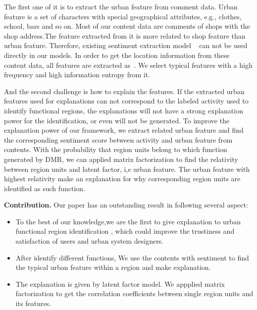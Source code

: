 \documentclass[runningheads]{llncs}
\begin{document}
The first one of it is to extract the urban feature from comment data.
Urban feature is a set of characters with special geographical attributes, e.g., clothes, school, bars and so on.
Most of our content data are comments of shops with the shop address.The feature extracted from it is more related to shop feature than urban feature.
Therefore, existing sentiment extraction model ~\cite{Lu2011Label} can not be used directly in our models.%
In order to get the location information from these content data, all features are extracted as~\cite{Zhang2015Sentires}.
We select typical features with a high frequency and high information entropy from it.


And the second challenge is how to explain the features.
If the extracted urban features used for explanations can not correspond to the labeled activity used to identify functional regions, the explanations will not have a strong explanation power for the identification, or even will not be generated.
To improve the explanation power of our framework, we extract related urban feature and find the corresponding sentiment score between activity and urban feature from contents.
With the probability that region units belong to which function generated by DMR, we can applied matrix factorization to find the relativity between region units and latent factor, i,e urban feature.
The urban feature with highest relativity make an explanation for why corresponding region units are identified as such function.


\textbf{Contribution.}
Our paper has an outstanding result in following several aspect:
\begin{itemize}
  \item To the best of our knowledge,we are the first to give explanation to urban functional region identification , which could improve the trustiness and satisfaction of users and urban system designers.
  \item After identify different functions, We use the contents with sentiment to find the typical urban feature within a region and make explanation.
  \item The explanation is given by latent factor model. We appplied matrix factorization to get the correlation coefficients between single region units and its features.
\end{itemize}
\end{document}
